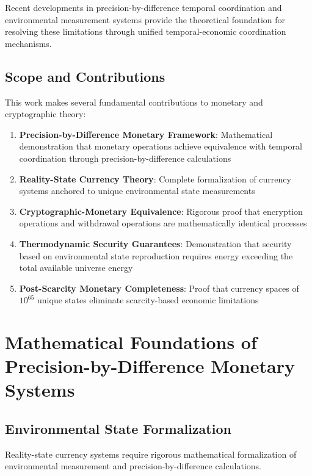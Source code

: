 \documentclass[12pt,a4paper]{article}
\begin{document}
Recent developments in precision-by-difference temporal coordination \cite{sachikonye2024sango} and environmental measurement systems \cite{sachikonye2024mdtec} provide the theoretical foundation for resolving these limitations through unified temporal-economic coordination mechanisms.

\subsection{Scope and Contributions}

This work makes several fundamental contributions to monetary and cryptographic theory:

\begin{enumerate}
\item \textbf{Precision-by-Difference Monetary Framework}: Mathematical demonstration that monetary operations achieve equivalence with temporal coordination through precision-by-difference calculations
\item \textbf{Reality-State Currency Theory}: Complete formalization of currency systems anchored to unique environmental state measurements
\item \textbf{Cryptographic-Monetary Equivalence}: Rigorous proof that encryption operations and withdrawal operations are mathematically identical processes
\item \textbf{Thermodynamic Security Guarantees}: Demonstration that security based on environmental state reproduction requires energy exceeding the total available universe energy
\item \textbf{Post-Scarcity Monetary Completeness}: Proof that currency spaces of $10^{65}$ unique states eliminate scarcity-based economic limitations
\end{enumerate}

\section{Mathematical Foundations of Precision-by-Difference Monetary Systems}

\subsection{Environmental State Formalization}

Reality-state currency systems require rigorous mathematical formalization of environmental measurement and precision-by-difference calculations.
\end{document}

